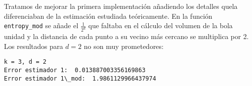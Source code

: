 \documentclass[10pt,a4paper]{article} %
\theoremstyle{definition}
\begin{document}
Tratamos de mejorar la primera implementación añadiendo los detalles quela diferenciaban de la estimación estudiada teóricamente. En la función \texttt{entropy\_mod} se añade el $\frac{1}{2^d}$ que faltaba en el cálculo del volumen de la bola unidad y la distancia de cada punto a su vecino más cercano se multiplica por 2. Los resultados para $d = 2$ no son muy prometedores:

\begin{lstlisting}
k = 3, d = 2
Error estimador 1:  0.013887003356169863
Error estimador 1\_mod:  1.9861129966437974
\end{lstlisting}



\printbibliography
\end{document}
